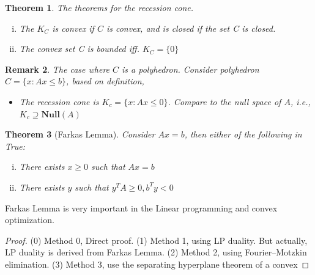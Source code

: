 \documentclass{beamerswitch}
\newtheorem{thm}{Theorem}[section]
\newtheorem{remark}[thm]{Remark}
\begin{document}
\begin{thm} The theorems for the recession cone.
    \begin{enumerate}[(i)]
        \item The \(K_C\) is convex if \(C\) is convex, and is closed if the set C is closed.
        \item The convex set C is bounded iff. \(K_C = \{0\}\)
    \end{enumerate}
\end{thm}

\begin{remark} The case where \(C\) is a polyhedron.
    Consider polyhedron \(C = \{x: Ax \le b\}\), based on definition,
    \begin{itemize}
        \item The recession cone is \(K_c = \{x: Ax \le 0\}\). Compare to the null space of \(A\), i.e., \(K_c \supseteq \mathbf{Null}(A)\)
    \end{itemize}
\end{remark}

\begin{thm}[Farkas Lemma]
    Consider \(Ax = b\), then either of the following in True:
    \begin{enumerate}[(i)]
        \item There exists \(x \ge 0\) such that \(Ax = b\)
        \item There exists \(y\) such that \(y^TA \ge 0, b^Ty < 0\)
    \end{enumerate}
\end{thm}

Farkas Lemma is very important in the Linear programming and convex optimization.
\begin{proof}
    (0) Method 0, Direct proof.
    (1) Method 1, using LP duality. But actually, LP duality is derived from Farkas Lemma.
    (2) Method 2, using Fourier–Motzkin elimination.
    (3) Method 3, use the separating hyperplane theorem of a convex
\end{proof}
\end{document}
